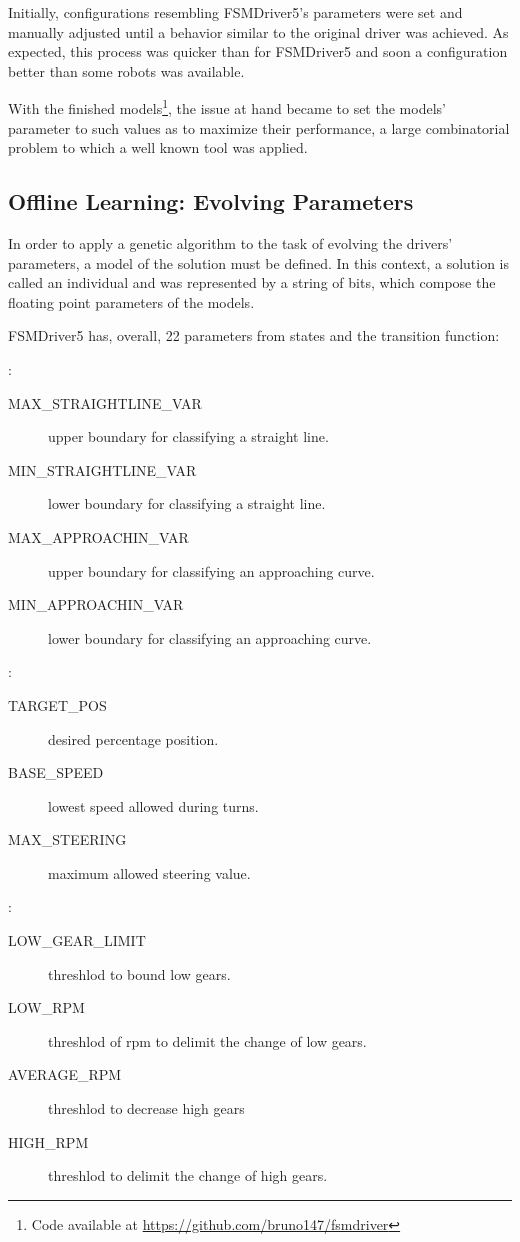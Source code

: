 Initially, configurations resembling FSMDriver5's parameters were set and manually adjusted until a behavior similar to the original driver was achieved. As expected, this process was quicker than for FSMDriver5 and soon a configuration better than some robots was available.

With the finished models\footnote{Code available at \url{https://github.com/bruno147/fsmdriver}}, the issue at hand became to set the models' parameter to such values as to maximize their performance, a large combinatorial problem to which a well known tool was applied.

\subsection{Offline Learning: Evolving Parameters}%
In order to apply a genetic algorithm to the task of evolving the drivers' parameters, a model of the solution must be defined. In this context, a solution is called an individual and was represented by a string of bits, which compose the floating point parameters of the models.

FSMDriver5 has, overall, 22 parameters from states and the transition function:


:%
\begin{description}
	\item[MAX\_STRAIGHTLINE\_VAR] upper boundary for classifying a straight line.
	\item[MIN\_STRAIGHTLINE\_VAR] lower boundary for classifying a straight line.
	\item[MAX\_APPROACHIN\_VAR] upper boundary for classifying an approaching curve.
	\item[MIN\_APPROACHIN\_VAR] lower boundary for classifying an approaching curve.
\end{description}

\AC:%
\begin{description}
	\item[TARGET\_POS] desired percentage position.
	\item[BASE\_SPEED] lowest speed allowed during turns.
	\item[MAX\_STEERING] maximum allowed steering value.
\end{description}

\SL:%
\begin{description}
	\item[LOW\_GEAR\_LIMIT] threshlod to bound low gears.
	\item[LOW\_RPM] threshlod of rpm to delimit the change of low gears.
	\item[AVERAGE\_RPM] threshlod to decrease high gears
	\item[HIGH\_RPM] threshlod to delimit the change of high gears.
\end{description}

